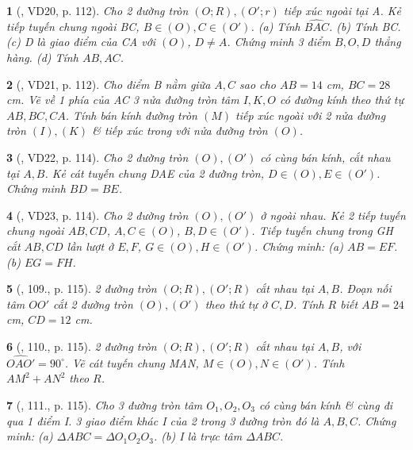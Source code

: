 \documentclass{article}
\newtheorem{baitoan}{}
\begin{document}
\begin{baitoan}[\cite{Binh_Toan_9_tap_1}, VD20, p. 112]
	Cho 2 đường tròn $(O;R),(O';r)$ tiếp xúc ngoài tại A. Kẻ tiếp tuyến chung ngoài BC, $B\in(O),C\in(O')$. (a) Tính $\widehat{BAC}$. (b) Tính BC. (c) D là giao điểm của CA với $(O)$, $D\ne A$. Chứng minh 3 điểm $B,O,D$ thẳng hàng. (d) Tính $AB,AC$.
\end{baitoan}

\begin{baitoan}[\cite{Binh_Toan_9_tap_1}, VD21, p. 112]
	Cho điểm B nằm giữa $A,C$ sao cho $AB = 14$ {\rm cm}, $BC = 28$ {\rm cm}. Vẽ về 1 phía của AC 3 nửa đường tròn tâm $I,K,O$ có đường kính theo thứ tự $AB,BC,CA$. Tính bán kính đường tròn $(M)$ tiếp xúc ngoài với 2 nửa đường tròn $(I),(K)$ \& tiếp xúc trong với nửa đường tròn $(O)$.
\end{baitoan}

\begin{baitoan}[\cite{Binh_Toan_9_tap_1}, VD22, p. 114]
	Cho 2 đường tròn $(O),(O')$ có cùng bán kính, cắt nhau tại $A,B$. Kẻ cát tuyến chung DAE của 2 đường tròn, $D\in(O),E\in(O')$. Chứng minh $BD = BE$.
\end{baitoan}

\begin{baitoan}[\cite{Binh_Toan_9_tap_1}, VD23, p. 114]
	Cho 2 đường tròn $(O),(O')$ ở ngoài nhau. Kẻ 2 tiếp tuyến chung ngoài $AB,CD$, $A,C\in(O)$, $B,D\in(O')$. Tiếp tuyến chung trong GH cắt $AB,CD$ lần lượt ở $E,F$, $G\in(O),H\in(O')$. Chứng minh: (a) $AB = EF$. (b) $EG = FH$.
\end{baitoan}

\begin{baitoan}[\cite{Binh_Toan_9_tap_1}, 109., p. 115]
	2 đường tròn $(O;R),(O';R)$ cắt nhau tại $A,B$. Đoạn nối tâm $OO'$ cắt 2 đường tròn $(O),(O')$ theo thứ tự ở $C,D$. Tính $R$ biết $AB = 24$ {\rm cm}, $CD = 12$ {\rm cm}.
\end{baitoan}

\begin{baitoan}[\cite{Binh_Toan_9_tap_1}, 110., p. 115]
	2 đường tròn $(O;R),(O';R)$ cắt nhau tại $A,B$, với $\widehat{OAO'} = 90^\circ$. Vẽ cát tuyến chung MAN, $M\in(O),N\in(O')$. Tính $AM^2 + AN^2$ theo $R$.
\end{baitoan}

\begin{baitoan}[\cite{Binh_Toan_9_tap_1}, 111., p. 115]
	Cho 3 đường tròn tâm $O_1,O_2,O_3$ có cùng bán kính \& cùng đi qua 1 điểm I. 3 giao điểm khác I của 2 trong 3 đường tròn đó là $A,B,C$. Chứng minh: (a) $\Delta ABC = \Delta O_1O_2O_3$. (b) I là trực tâm $\Delta ABC$.
\end{baitoan}
\end{document}
